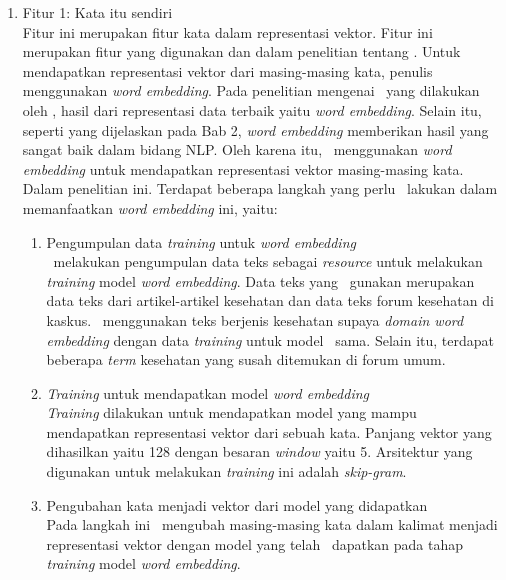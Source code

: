 \begin{enumerate}
	\item Fitur 1: Kata itu sendiri\\
	Fitur ini merupakan fitur kata dalam representasi vektor. Fitur ini merupakan fitur yang digunakan \cite{abacha2011medical} dan \cite{skripsiKakRadit} dalam penelitian tentang \mer. Untuk mendapatkan representasi vektor dari masing-masing kata, penulis menggunakan \textit{word embedding}. Pada penelitian mengenai \mer~yang dilakukan oleh \cite{mujiono2016new}, hasil dari representasi data terbaik yaitu \textit{word embedding}. Selain itu, seperti yang dijelaskan pada Bab 2, \textit{word embedding} memberikan hasil yang sangat baik dalam bidang NLP. Oleh karena itu, \saya~menggunakan \textit{word embedding} untuk mendapatkan representasi vektor masing-masing kata. Dalam penelitian ini. Terdapat beberapa langkah yang perlu \saya~lakukan dalam memanfaatkan \textit{word embedding} ini, yaitu:
	\begin{enumerate}
		\item Pengumpulan data \textit{training} untuk \textit{word embedding}\\
		\Saya~melakukan pengumpulan data teks sebagai \textit{resource} untuk melakukan \textit{training} model \textit{word embedding}. Data teks yang \saya~gunakan merupakan data teks dari artikel-artikel kesehatan dan data teks forum kesehatan di kaskus. \Saya~menggunakan teks berjenis kesehatan supaya \textit{domain word embedding} dengan data \textit{training} untuk model \mer~sama. Selain itu, terdapat beberapa \textit{term} kesehatan yang susah ditemukan di forum umum.
		 
		\item \textit{Training} untuk mendapatkan model \textit{word embedding}\\
		\textit{Training} dilakukan untuk mendapatkan model yang mampu mendapatkan representasi vektor dari sebuah kata. Panjang vektor yang dihasilkan yaitu 128 dengan besaran \textit{window} yaitu 5. Arsitektur yang digunakan untuk melakukan \textit{training} ini adalah \textit{skip-gram}.
		
		\item Pengubahan kata menjadi vektor dari model yang didapatkan\\
		Pada langkah ini \saya~mengubah masing-masing kata dalam kalimat menjadi representasi vektor dengan model yang telah \saya~dapatkan pada tahap \textit{training} model \textit{word embedding}.
	\end{enumerate}
	

\end{enumerate}
